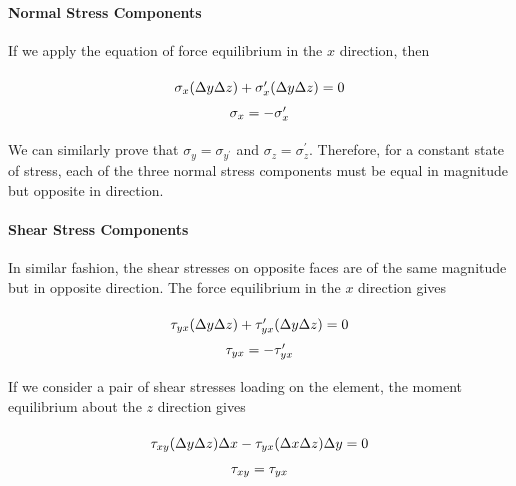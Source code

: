 \documentclass[
10pt,
a4paper,
openany,
svgnames,
]{kaobook} %
\begin{document}
\paragraph{Normal Stress Components}

If we apply the equation of force equilibrium in the $x$ direction, then

\begin{equation}
  \arraycolsep=1.4pt\def\arraystretch{1.5}
  \begin{array}{c}
    \sigma_x(\Delta y\Delta z) + \sigma_x^\prime(\Delta y\Delta z) = 0\\
    \sigma_x =  - \sigma_x^\prime
  \end{array}
\end{equation}

We can similarly prove that $\sigma_y = \sigma_{y ^\prime}$ and $\sigma_z = \sigma_z ^\prime$. Therefore, for a constant state of stress, each of the three normal stress components must be equal in magnitude but opposite in direction.

\paragraph{Shear Stress Components}

In similar fashion, the shear stresses on opposite faces are of the same magnitude but in opposite direction.
The force equilibrium in the $x$ direction gives

\begin{equation}
  \arraycolsep=1.4pt\def\arraystretch{1.5}
  \begin{array}{c}
    {\tau _{yx}}(\Delta y\Delta z) + {\tau_{yx}^\prime}(\Delta y\Delta z) = 0\\
    {\tau _{yx}} =  - {\tau_{yx}^\prime}
  \end{array}
\end{equation}

If we consider a pair of shear stresses loading on the element, the moment equilibrium about the $z$ direction gives

\begin{equation}
  \arraycolsep=1.4pt\def\arraystretch{1.5}
  \begin{array}{c}
    {\tau _{xy}}(\Delta y\Delta z)\Delta x - {\tau _{yx}}(\Delta x\Delta z)\Delta y = 0\\
    {\tau _{xy}} = {\tau _{yx}}
  \end{array}
\end{equation}
\end{document}
